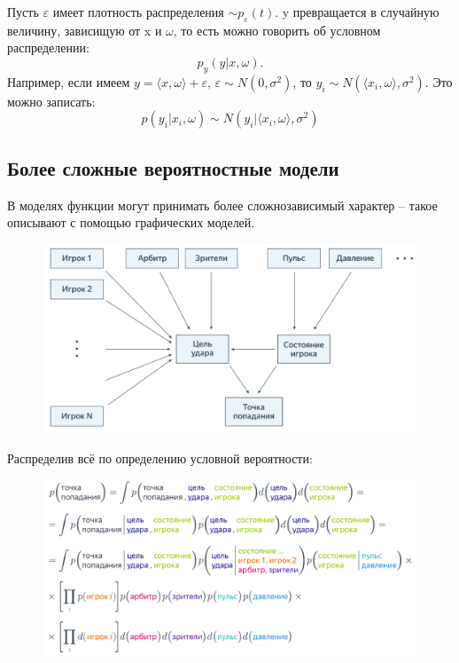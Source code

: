 \documentclass[a4paper, 10pt, openany]{book} %
\begin{document}
	Пусть $\varepsilon$ имеет плотность распределения $\sim p_\varepsilon(t)$. y превращается в случайную величину, зависищую от x и $\omega$, то есть можно говорить об условном распределении:
	\begin{equation*}
	    p_y(y|x, \omega).
	\end{equation*}
	Например, если имеем $y = \langle x, \omega \rangle + \varepsilon$, $\varepsilon \sim N(0, \sigma^2)$, то $y_i \sim N(\langle x_i, \omega \rangle, \sigma^2).$ Это можно записать:
	\begin{equation*}
	    p(y_i|x_i, \omega) \sim N(y_i|\langle x_i, \omega \rangle, \sigma^2)
	\end{equation*}
	
	\subsection{Более сложные вероятностные модели}
	
	В моделях функции могут принимать более сложнозависимый характер -- такое описывают с помощью   графических моделей.
	\begin{figure}[h!]
	    \centering
	    \includegraphics[width=\linewidth]{pictures/Probabilistic_models/Graphic_model.png}
	\end{figure}
	
	Распределив всё по определению условной вероятности:
	\begin{figure}[h!]
	    \centering
	    \includegraphics[width=\linewidth]{pictures/Probabilistic_models/Prob_example.png}
	\end{figure}
	
\end{document}
